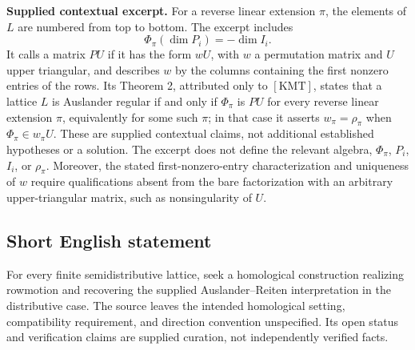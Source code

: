 \documentclass[11pt]{article}
\begin{document}
\textbf{Supplied contextual excerpt.} For a reverse linear extension \(\pi\), the elements of \(L\) are numbered from top to bottom. The excerpt includes
\[
 \Phi_\pi(\dim P_i)=-\dim I_i.
\]
It calls a matrix \(PU\) if it has the form \(wU\), with \(w\) a permutation matrix and \(U\) upper triangular, and describes \(w\) by the columns containing the first nonzero entries of the rows. Its Theorem 2, attributed only to \([\mathrm{KMT}]\), states that a lattice \(L\) is Auslander regular if and only if \(\Phi_\pi\) is \(PU\) for every reverse linear extension \(\pi\), equivalently for some such \(\pi\); in that case it asserts \(w_\pi=\rho_\pi\) when \(\Phi_\pi\in w_\pi U\). These are supplied contextual claims, not additional established hypotheses or a solution. The excerpt does not define the relevant algebra, \(\Phi_\pi\), \(P_i\), \(I_i\), or \(\rho_\pi\). Moreover, the stated first-nonzero-entry characterization and uniqueness of \(w\) require qualifications absent from the bare factorization with an arbitrary upper-triangular matrix, such as nonsingularity of \(U\).
\subsection{Short English statement}
For every finite semidistributive lattice, seek a homological construction realizing rowmotion and recovering the supplied Auslander--Reiten interpretation in the distributive case. The source leaves the intended homological setting, compatibility requirement, and direction convention unspecified. Its open status and verification claims are supplied curation, not independently verified facts.
\end{document}
